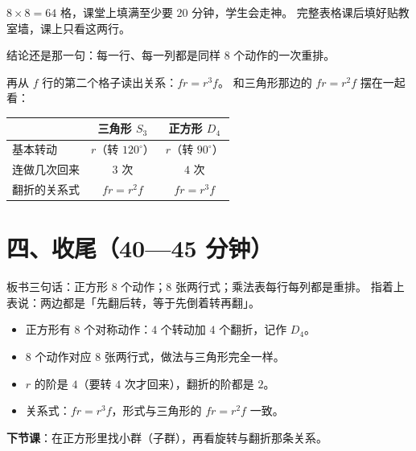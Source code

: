 \begin{zhu}
  \(8\times8=64\) 格，课堂上填满至少要 \(20\) 分钟，学生会走神。
  完整表格课后填好贴教室墙，课上只看这两行。
\end{zhu}

结论还是那一句：每一行、每一列都是同样 \(8\) 个动作的一次重排。

再从 \(f\) 行的第二个格子读出关系：\(fr=r^3f\)。
和三角形那边的 \(fr=r^2f\) 摆在一起看：

\begin{center}
\begin{tabular}{@{}lcc@{}}
  \toprule
   & 三角形 \(S_3\) & 正方形 \(D_4\) \\
  \midrule
  基本转动 & \(r\)（转 \(120^\circ\)） & \(r\)（转 \(90^\circ\)） \\
  连做几次回来 & \(3\) 次 & \(4\) 次 \\
  翻折的关系式 & \(fr=r^2f\) & \(fr=r^3f\) \\
  \bottomrule
\end{tabular}
\end{center}

\section*{四、收尾（40—45 分钟）}

板书三句话：正方形 \(8\) 个动作；\(8\) 张两行式；乘法表每行每列都是重排。
指着上表说：两边都是「先翻后转，等于先倒着转再翻」。

\begin{xiaojie}
  \begin{itemize}
    \item 正方形有 \(8\) 个对称动作：\(4\) 个转动加 \(4\) 个翻折，记作 \(D_4\)。
    \item \(8\) 个动作对应 \(8\) 张两行式，做法与三角形完全一样。
    \item \(r\) 的阶是 \(4\)（要转 \(4\) 次才回来），翻折的阶都是 \(2\)。
    \item 关系式：\(fr=r^3f\)，形式与三角形的 \(fr=r^2f\) 一致。
  \end{itemize}
\end{xiaojie}

\noindent\textbf{下节课}：在正方形里找小群（子群），再看旋转与翻折那条关系。